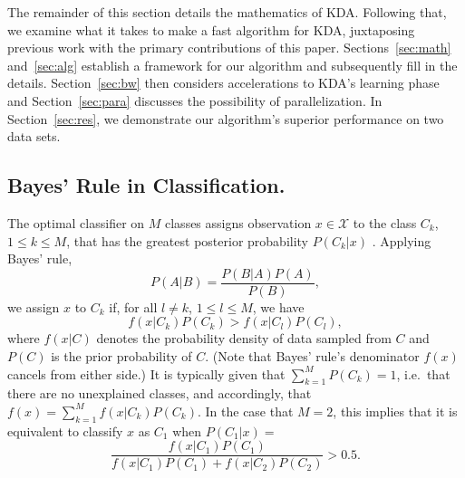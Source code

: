 \documentclass[twoside,leqno,twocolumn]{article}
\begin{document}
The remainder of this section details the mathematics of KDA.
Following that, we examine what it takes to make a fast algorithm for
KDA, juxtaposing previous work with the primary contributions of this
paper.  Sections~\ref{sec:math} and~\ref{sec:alg} establish a
framework for our algorithm and subsequently fill in the details.
Section~\ref{sec:bw} then considers accelerations to KDA's learning
phase and Section~\ref{sec:para} discusses the possibility of
parallelization.  In Section~\ref{sec:res}, we demonstrate our
algorithm's superior performance on two data sets.

\subsection{Bayes' Rule in Classification.}
The optimal classifier on $M$ classes assigns observation $x \in
\mathcal{X}$ to the class $C_k$, $1 \leq k \leq M$, that has the
greatest posterior probability $P(C_k|x)$ \cite{rao73}.  Applying
Bayes' rule,
\begin{equation}
  P(A|B) = \frac{P(B|A)P(A)}{P(B)} ,
\end{equation}
we assign $x$ to $C_k$ if, for all $l \neq k$, $1 \leq l \leq M$, we
have
\begin{equation}\label{eqn:ineq-form}
  f(x|C_k)P(C_k) > f(x|C_l)P(C_l) ,
\end{equation}
where $f(x|C)$ denotes the probability density of data sampled from
$C$ and $P(C)$ is the prior probability of $C$.  (Note that Bayes'
rule's denominator $f(x)$ cancels from either side.)  It is typically
given that $\sum_{k=1}^M P(C_k) = 1$, i.e.~that there are no
unexplained classes, and accordingly, that $f(x) = \sum_{k=1}^M
f(x|C_k)P(C_k)$.  In the case that $M = 2$, this implies that it is
equivalent to classify $x$ as $C_1$ when $P(C_1|x) =$
\begin{equation}\label{eqn:prob-form}
  \frac{f(x|C_1)P(C_1)}{f(x|C_1)P(C_1) + f(x|C_2)P(C_2)} > 0.5 .
\end{equation}
\end{document}
